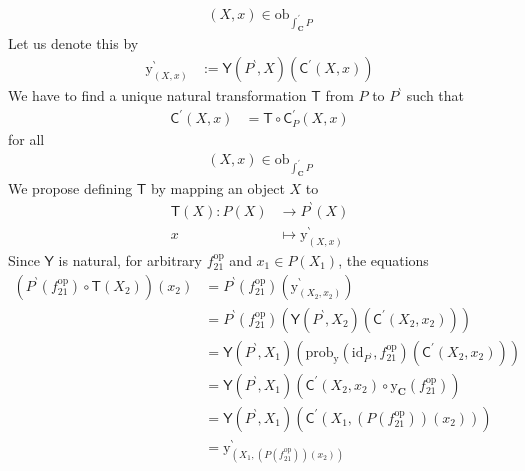 \begin{prf}
\begin{description}
\begin{align*}
  (X,x)
  \in
  \mathrm{ob}_{\int_{\mathbf{C}}^{\prime}P}
\end{align*}
Let us denote this by
\begin{align*}
  \mathrm{y}_{(X,x)}^{\backprime}
  &:=
  \mathsf{Y}(P^{\backprime},X)
  \left(
    \mathsf{C}^{\prime}(X,x)
  \right)
\end{align*}
We have to find a unique natural transformation $\mathsf{T}$ from $P$ to $P^{\backprime}$ such that
\begin{align*}
  \mathsf{C}^{\prime}(X,x)
  &=
  \mathsf{T}
  \circ
  \mathsf{C}_{P}^{\prime}(X,x)
\end{align*}
for all
\begin{align*}
  (X,x)
  \in
  \mathrm{ob}_{\int_{\mathbf{C}}^{\prime}P}
\end{align*}
We propose defining $\mathsf{T}$ by mapping an object $X$ to
\begin{align*}
  \mathsf{T}(X)
  \colon
  P(X)
  &\rightarrow
  P^{\backprime}(X)
  \\
  x
  &\mapsto
  \mathrm{y}_{(X,x)}^{\backprime}
\end{align*}
Since $\mathsf{Y}$ is natural, for arbitrary $f_{21}^{\mathrm{op}}$ and $x_{1} \in P(X_{1})$,
the equations
\begin{align*}
  \left(
    P^{\backprime}(f_{21}^{\mathrm{op}})
    \circ
    \mathsf{T}(X_{2})
  \right)
  (x_{2})
  &=
  P^{\backprime}(f_{21}^{\mathrm{op}})
  \left(
    \mathrm{y}_{(X_{2},x_{2})}^{\backprime}
  \right)
  \\
  &=
  P^{\backprime}(f_{21}^{\mathrm{op}})
  \left(
    \mathsf{Y}(P^{\backprime},X_{2})
    \left(
      \mathsf{C}^{\prime}(X_{2},x_{2})
    \right)
  \right)
  \\
  &=
  \mathsf{Y}(P^{\backprime},X_{1})
  \left(
    \mathrm{prob}_{\mathrm{y}}
    \left(
      \mathrm{id}_{P^{\backprime}},
      f_{21}^{\mathrm{op}}
    \right)
    \left(
      \mathsf{C}^{\prime}(X_{2},x_{2})
    \right)
  \right)
  \tag{NT}
  \\
  &=
  \mathsf{Y}(P^{\backprime},X_{1})
  \left(
    \mathsf{C}^{\prime}(X_{2},x_{2})
    \circ
    \mathrm{y}_{\mathbf{C}}(f_{21}^{\mathrm{op}})
  \right)
  \\
  &=
  \mathsf{Y}(P^{\backprime},X_{1})
  \left(
    \mathsf{C}^{\prime}
    \left(
      X_{1},
      \left(
        P(f_{21}^{\mathrm{op}})
      \right)
      (x_{2})
    \right)
  \right)
  \\
  &=
  \mathrm{y}_{(X_{1},(P(f_{21}^{\mathrm{op}}))(x_{2}))}^{\backprime}

\end{align*}
\end{description}
\end{prf}

